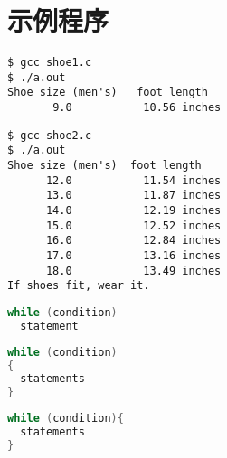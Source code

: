 \section{示例程序}

\begin{frame}\ft{\secname}
 

\end{frame}


\begin{frame}[fragile]\ft{\secname}
\begin{lstlisting}[backgroundcolor=\color{red!10}]
$ gcc shoe1.c
$ ./a.out 
Shoe size (men's)   foot length
       9.0           10.56 inches
\end{lstlisting}
\end{frame}


\begin{frame}\ft{\secname}
 
\end{frame}



\begin{frame}[fragile]\ft{\secname}
\begin{lstlisting}[backgroundcolor=\color{red!10}]
$ gcc shoe2.c
$ ./a.out 
Shoe size (men's)  foot length
      12.0           11.54 inches
      13.0           11.87 inches
      14.0           12.19 inches
      15.0           12.52 inches
      16.0           12.84 inches
      17.0           13.16 inches
      18.0           13.49 inches
If shoes fit, wear it.
\end{lstlisting}
\end{frame}


\begin{frame}[fragile]
\begin{lstlisting}[language=c,frame=single]
while (condition)
  statement
\end{lstlisting}

\begin{lstlisting}[language=c,frame=single]
while (condition)
{
  statements
}
\end{lstlisting}

\begin{lstlisting}[language=c,frame=single]
while (condition){
  statements
}
\end{lstlisting}


\end{frame}



